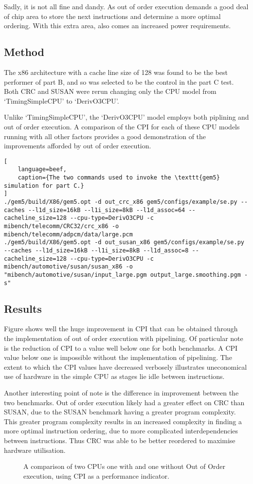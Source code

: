 Sadly, it is not all fine and dandy. As out of order execution demands a good
deal of chip area to store the next instructions and determine a more optimal
ordering. With this extra area, also comes an increased power requirements.

\subsection{Method}

The x86 architecture with a cache line size of 128 was found to be the best
performer of part B, and so was selected to be the control in the part C test.
Both CRC and SUSAN were rerun changing only the CPU model from `TimingSimpleCPU'
to `DerivO3CPU'.

Unlike `TimingSimpleCPU', the `DerivO3CPU' model employs both piplining and out
of order execution. A comparison of the CPI for each of these CPU models running
with all other factors provides a good demonstration of the improvements
afforded by out of order execution.

\begin{lstlisting}[
    language=beef,
    caption={The two commands used to invoke the \texttt{gem5} simulation for part C.}
]
./gem5/build/X86/gem5.opt -d out_crc_x86 gem5/configs/example/se.py --caches --l1d_size=16kB --l1i_size=8kB --l1d_assoc=64 --cacheline_size=128 --cpu-type=DerivO3CPU -c mibench/telecomm/CRC32/crc_x86 -o mibench/telecomm/adpcm/data/large.pcm
./gem5/build/X86/gem5.opt -d out_susan_x86 gem5/configs/example/se.py --caches --l1d_size=16kB --l1i_size=8kB --l1d_assoc=8 --cacheline_size=128 --cpu-type=DerivO3CPU -c mibench/automotive/susan/susan_x86 -o "mibench/automotive/susan/input_large.pgm output_large.smoothing.pgm -s"
\end{lstlisting}


\subsection{Results}
Figure \label{fig:partc-cpi} shows well the huge improvement in CPI that can be
obtained through the implementation of out of order execution with pipelining.
Of particular note is the reduction of CPI to a value well below one for both
benchmarks. A CPI value below one is impossible without the implementation of
pipelining.
The extent to which the CPI values have decreased verbosely illustrates
uneconomical use of hardware in the simple CPU as stages lie idle between
instructions.

Another interesting point of note is the difference in improvement between the
two benchmarks. Out of order execution likely had a greater effect on CRC than
SUSAN, due to the SUSAN benchmark having a greater program complexity. This
greater program complexity results in an increased complexity in finding a more
optimal instruction ordering, due to more complicated interdependencies between
instructions. Thus CRC was able to be better reordered to maximise hardware
utilisation.

\begin{figure}
    \centering
    
    \caption{
        A comparison of two CPUs one with and one without Out of Order
    execution, using CPI as a performance indicator.
    }
    \label{fig:partc-cpi}
\end{figure}
